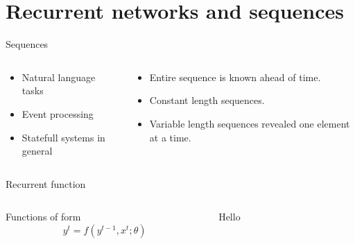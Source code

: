 \section{Recurrent networks and sequences}

\begin{frame}{Sequences} 
	\begin{columns}
		\begin{column}{.5\textwidth}
			\begin{itemize}
				\item Natural language tasks 
				\item Event processing  
				\item Statefull systems in general
			\end{itemize}	
		\end{column}
		\begin{column}{.5\textwidth}
			\begin{itemize}
				\item Entire sequence is known ahead of time. 
				\item Constant length sequences. 
				\item Variable length sequences revealed one 
				element at a time.
			\end{itemize}
		\end{column}
	\end{columns}
\end{frame}

\begin{frame}{Recurrent function}
\begin{columns}
	\begin{column}{.5\textwidth}
		Functions of form
		\begin{equation}
		y^t = f(y^{t-1}, x^t; \theta) 
		\end{equation}
	\end{column}
	\begin{column}{.5\textwidth}
		Hello
	\end{column}
\end{columns}

\end{frame}